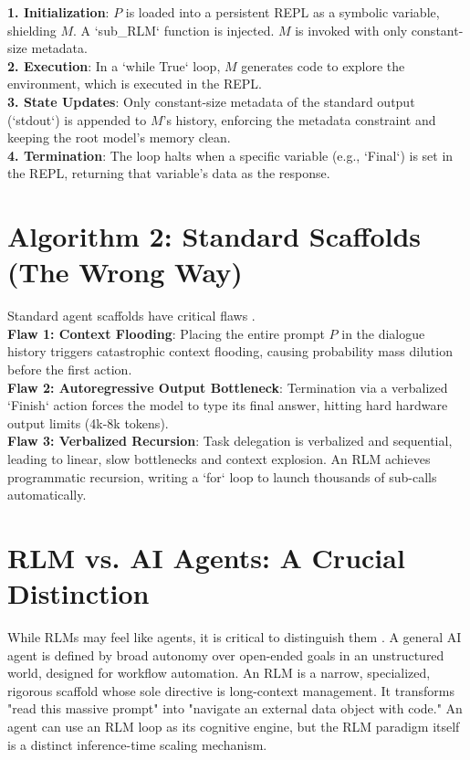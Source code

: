 \noindent \textbf{1. Initialization}: $P$ is loaded into a persistent REPL as a symbolic variable, shielding $M$. A `sub\_RLM` function is injected. $M$ is invoked with only constant-size metadata. \\
\textbf{2. Execution}: In a `while True` loop, $M$ generates code to explore the environment, which is executed in the REPL. \\
\textbf{3. State Updates}: Only constant-size metadata of the standard output (`stdout`) is appended to $M$'s history, enforcing the metadata constraint and keeping the root model's memory clean. \\
\textbf{4. Termination}: The loop halts when a specific variable (e.g., `Final`) is set in the REPL, returning that variable's data as the response.

\section{Algorithm 2: Standard Scaffolds (The Wrong Way)}
\noindent Standard agent scaffolds have critical flaws \cite{yao2023, wang2024}. \\
\textbf{Flaw 1: Context Flooding}: Placing the entire prompt $P$ in the dialogue history triggers catastrophic context flooding, causing probability mass dilution before the first action. \\
\textbf{Flaw 2: Autoregressive Output Bottleneck}: Termination via a verbalized `Finish` action forces the model to type its final answer, hitting hard hardware output limits (4k-8k tokens). \\
\textbf{Flaw 3: Verbalized Recursion}: Task delegation is verbalized and sequential, leading to linear, slow bottlenecks and context explosion. An RLM achieves programmatic recursion, writing a `for` loop to launch thousands of sub-calls automatically.



\section{RLM vs. AI Agents: A Crucial Distinction}
While RLMs may feel like agents, it is critical to distinguish them \cite{zhang2025}. A general AI agent is defined by broad autonomy over open-ended goals in an unstructured world, designed for workflow automation. An RLM is a narrow, specialized, rigorous scaffold whose sole directive is long-context management. It transforms "read this massive prompt" into "navigate an external data object with code." An agent can use an RLM loop as its cognitive engine, but the RLM paradigm itself is a distinct inference-time scaling mechanism.

